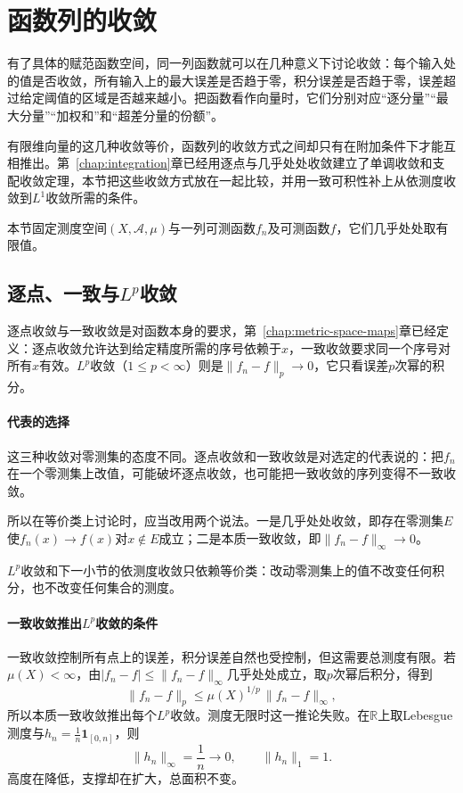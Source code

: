 \section{函数列的收敛}
\label{sec:nspace-convergence-of-sequences}

有了具体的赋范函数空间，同一列函数就可以在几种意义下讨论收敛：每个输入处的值是否收敛，所有输入上的最大误差是否趋于零，积分误差是否趋于零，误差超过给定阈值的区域是否越来越小。把函数看作向量时，它们分别对应“逐分量”“最大分量”“加权和”和“超差分量的份额”。

有限维向量的这几种收敛等价，函数列的收敛方式之间却只有在附加条件下才能互相推出。第~\ref{chap:integration}章已经用逐点与几乎处处收敛建立了单调收敛和支配收敛定理，本节把这些收敛方式放在一起比较，并用一致可积性补上从依测度收敛到$L^1$收敛所需的条件。

本节固定测度空间$(X,\mathcal A,\mu)$与一列可测函数$f_n$及可测函数$f$，它们几乎处处取有限值。

\subsection{逐点、一致与\texorpdfstring{$L^p$}{Lp}收敛}
\label{sec:nspace-pointwise-uniform-lp}

逐点收敛与一致收敛是对函数本身的要求，第~\ref{chap:metric-space-maps}章已经定义：逐点收敛允许达到给定精度所需的序号依赖于$x$，一致收敛要求同一个序号对所有$x$有效。$L^p$收敛（$1\leq p<\infty$）则是$\lVert f_n-f\rVert_p\to0$，它只看误差$p$次幂的积分。

\paragraph{代表的选择}
这三种收敛对零测集的态度不同。逐点收敛和一致收敛是对选定的代表说的：把$f_n$在一个零测集上改值，可能破坏逐点收敛，也可能把一致收敛的序列变得不一致收敛。

所以在等价类上讨论时，应当改用两个说法。一是几乎处处收敛，即存在零测集$E$使$f_n(x)\to f(x)$对$x\notin E$成立；二是本质一致收敛，即$\lVert f_n-f\rVert_\infty\to0$。

$L^p$收敛和下一小节的依测度收敛只依赖等价类：改动零测集上的值不改变任何积分，也不改变任何集合的测度。

\paragraph{一致收敛推出\texorpdfstring{$L^p$}{Lp}收敛的条件}
一致收敛控制所有点上的误差，积分误差自然也受控制，但这需要总测度有限。若$\mu(X)<\infty$，由$\lvert f_n-f\rvert\leq\lVert f_n-f\rVert_\infty$几乎处处成立，取$p$次幂后积分，得到
\begin{equation}
 \lVert f_n-f\rVert_p\leq\mu(X)^{1/p}\,\lVert f_n-f\rVert_\infty ,
 \label{eq:nspace-uniform-to-lp}
\end{equation}
所以本质一致收敛推出每个$L^p$收敛。测度无限时这一推论失败。在$\mathbb R$上取Lebesgue测度与$h_n=\tfrac1n\mathbf 1_{[0,n]}$，则
\[
 \lVert h_n\rVert_\infty=\frac1n\to0,\qquad \lVert h_n\rVert_1=1.
\]
高度在降低，支撑却在扩大，总面积不变。

